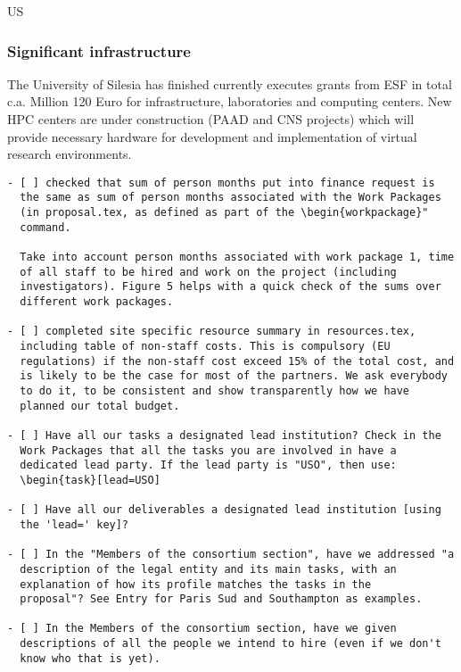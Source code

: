 \begin{sitedescription}{US}
\subsubsection*{Significant infrastructure}

The University of Silesia has finished currently executes grants from
ESF in total c.a. Million 120 Euro for infrastructure, laboratories and
computing centers. New HPC centers are under construction (PAAD and
CNS projects) which will provide necessary hardware for development
and implementation of virtual research environments.
\end{sitedescription}





\begin{draft}
\vspace{1cm}

\begin{verbatim}
- [ ] checked that sum of person months put into finance request is
  the same as sum of person months associated with the Work Packages
  (in proposal.tex, as defined as part of the \begin{workpackage}"
  command.
  
  Take into account person months associated with work package 1, time
  of all staff to be hired and work on the project (including
  investigators). Figure 5 helps with a quick check of the sums over
  different work packages.

- [ ] completed site specific resource summary in resources.tex,
  including table of non-staff costs. This is compulsory (EU
  regulations) if the non-staff cost exceed 15% of the total cost, and
  is likely to be the case for most of the partners. We ask everybody
  to do it, to be consistent and show transparently how we have
  planned our total budget.

- [ ] Have all our tasks a designated lead institution? Check in the
  Work Packages that all the tasks you are involved in have a
  dedicated lead party. If the lead party is "USO", then use:
  \begin{task}[lead=USO]

- [ ] Have all our deliverables a designated lead institution [using
  the 'lead=' key]?

- [ ] In the "Members of the consortium section", have we addressed "a
  description of the legal entity and its main tasks, with an
  explanation of how its profile matches the tasks in the
  proposal"? See Entry for Paris Sud and Southampton as examples.

- [ ] In the Members of the consortium section, have we given
  descriptions of all the people we intend to hire (even if we don't
  know who that is yet). 
\end{verbatim}
\end{draft}





